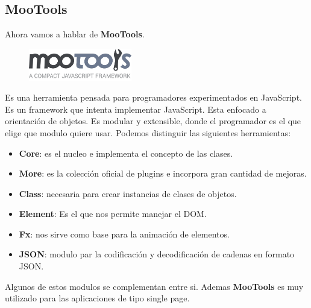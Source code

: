 \documentclass[12pt,a4paper]{article}
\begin{document}
\subsection{MooTools}
Ahora vamos a hablar de \textbf{MooTools}.
\begin{figure}[H]
	\centering
	\includegraphics[width=0.4\textwidth]{images/mootools.png}
\end{figure}
Es una herramienta pensada para programadores experimentados en JavaScript.  Es un framework que intenta implementar JavaScript. Esta enfocado a orientación de objetos. Es modular y extensible, donde el programador es el que elige que modulo quiere usar. Podemos distinguir las siguientes herramientas:
\begin{itemize}
	\item \textbf{Core}: es el nucleo e implementa el concepto de las clases.
	\item \textbf{More}: es la colección oficial de plugins  e incorpora gran cantidad de mejoras.
	\item \textbf{Class}: necesaria para crear instancias de clases de objetos.
	\item \textbf{Element}: Es el que nos permite manejar el DOM.
	\item \textbf{Fx}: nos sirve como base para la animación de elementos.
	\item \textbf{JSON}: modulo par la codificación y decodificación de cadenas en formato JSON.
\end{itemize}
Algunos de estos modulos se complementan entre si. Ademas \textbf{MooTools} es muy utilizado para las aplicaciones de tipo single page. 
\end{document}

